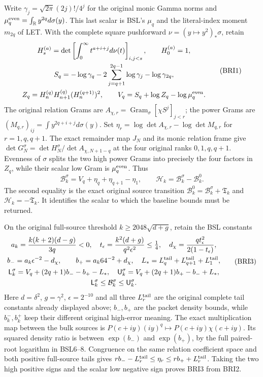 \documentclass[11pt,a4paper]{article}
\begin{document}
Write $\gamma_j=\sqrt{2\pi}(2j)!/4^j$ for the original monic
Gamma norms and $\mu_q^{\rm even}=\int_{\mathbb R}y^{2q}d\sigma(y)$.
This last scalar is BSL's $\mu_q$ and the literal-index moment
$m_{2q}$ of LET. With the complete square pushforward
$\nu=(y\mapsto y^2)_*\sigma$, retain
\[
\begin{gathered}
 H_s^{(a)}=\det\left[\int_0^\infty t^{a+i+j}d\nu(t)\right]_{i,j<s},
 \qquad H_0^{(a)}=1,\\
 S_q=-\log\gamma_q-2\sum_{j=q+1}^{2q-1}\log\gamma_j
                                             -\log\gamma_{2q},\\
 Z_q=H_n^{(q)}H_{n+1}^{(q)}(H_n^{(q+1)})^2,
 \qquad V_q=S_q+\log Z_q-\log\mu_q^{\rm even}.
\end{gathered}\tag{BRI1}
\]
The original relation Grams are
$A_{\chi,r}=\operatorname{Gram}_\sigma[\chi S^j]_{j<r}$;
the power Grams are
$(M_{q,r})_{ij}=\int y^{2q+i+j}d\sigma(y)$.
Set $\eta_r=\log\det A_{\chi,r}-\log\det M_{q,r}$ for
$r=1,q,q+1$. The exact remainder map $J_N$ and its monic
relation frame give $\det G_N^\sigma=\det H_N^\sigma/
\det A_{\chi,N+1-q}$ at the four original ranks $0,1,q,q+1$.
Evenness of $\sigma$ splits the two high power Grams into precisely
the four factors in $Z_q$, while their scalar low Gram is
$\mu_q^{\rm even}$. Thus
\[
 \mathcal B_k^\sigma=V_q+\eta_q+\eta_{q+1}-\eta_1,
 \qquad \mathcal H_k=\mathcal B_k^\sigma-\mathcal B_k^0.
 \tag{BRI2}
\]
The second equality is the exact original source transition
$\mathcal B_k^0=\mathcal B_k^\sigma+\mathfrak T_k$ and
$\mathcal H_k=-\mathfrak T_k$. It identifies the scalar to
which the baseline bounds must be returned.

On the original full-source threshold
$k\geq2048\sqrt{d+g}$, retain the BSL constants
\[
\begin{gathered}
 a_k=\frac{k(k+2)(d-g)}{3q}<0,\quad
 t_\epsilon=\frac{k^2(d+g)}{q^2\epsilon^2}\leq\tfrac14,
 \quad d_\chi=\frac{qt_\epsilon^2}{2(1-t_\epsilon)},\\
 b_-=a_k\epsilon^{-2}-d_\chi,
 \qquad b_+=a_k64^{-2}+d_\chi,
 \quad L_*=L_q^{\rm tail}+L_{q+1}^{\rm tail}+L_1^{\rm tail},\\
 \mathsf L_k^\sigma=V_q+(2q+1)b_- -b_+-L_*,\quad
 \mathsf U_k^\sigma=V_q+(2q+1)b_+ -b_-+L_*,\\
 \mathsf L_k^\sigma\leq\mathcal B_k^\sigma
                                  \leq\mathsf U_k^\sigma.
\end{gathered}\tag{BRI3}
\]
Here $d=\delta^2$, $g=\gamma^2$, $\epsilon=2^{-10}$ and
all three $L_r^{\rm tail}$ are the original complete tail constants
already displayed above; $b_-,b_+$ are the packet density bounds,
while $b_k^-,b_k^+$ keep their different original high-error meaning.
The exact multiplication map between the bulk sources is
$P(c+iy)(iy)^q\mapsto P(c+iy)\chi(c+iy)$.
Its squared density ratio is between $\exp(b_-)$ and
$\exp(b_+)$, by the full paired-root logarithm in BSL6--8.
Congruence on the same relation coefficient space and both positive
full-source tails gives $rb_- -L_r^{\rm tail}\leq\eta_r
\leq rb_++L_r^{\rm tail}$. Taking the two high positive signs
and the scalar low negative sign proves BRI3 from BRI2.
\end{document}
